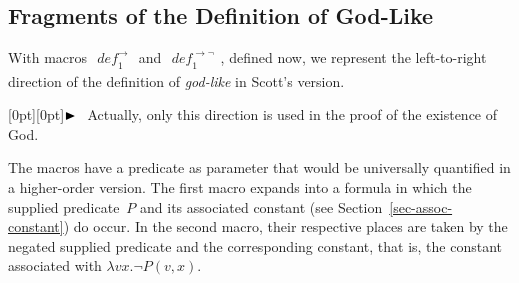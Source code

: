 \documentclass[a4paper]{article}
\newcommand{\pplmacro}[1]{\mathit{#1}}
\newcounter{def}
\newcommand{\name}[1]{\textit{#1}}
\newcommand{\highlightpar}{\noindent\raisebox{0.2ex}[0pt][0pt]{$\blacktriangleright\hspace{0.8em}$}}
\begin{document}
  \subsection{Fragments of the Definition of God-Like}
  \label{sec-def-g}

  With macros $\begin{array}{l}
\pplmacro{def_{1}^{\rightarrow}}
\end{array}
$ and $\begin{array}{l}
\pplmacro{def_{1}^{\rightarrow \lnot}}
\end{array}
$, defined
  now, we represent the left-to-right direction of the definition of
  \name{god-like} in Scott's version.

  \highlightpar Actually, only this direction is used in the proof of the
  existence of God.

  \noindent The macros have a predicate as parameter that would be universally
  quantified in a higher-order version. The first macro expands into a formula
  in which the supplied predicate~$P$ and its associated constant (see
  Section~\ref{sec-assoc-constant}) do occur. In the second macro, their
  respective places are taken by the negated supplied predicate and the
  corresponding constant, that is, the constant associated with $\lambda v x
  . \lnot P(v,x)$.
\end{document}

